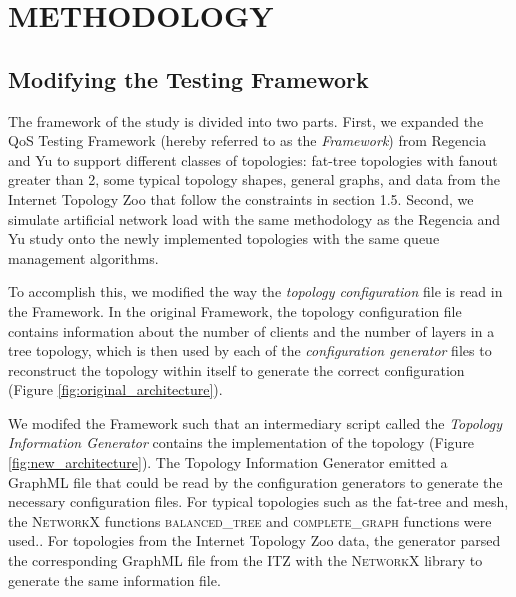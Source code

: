\chapter{METHODOLOGY}
\section{Modifying the Testing Framework}
The framework of the study is divided into two parts. First, we expanded the QoS Testing Framework (hereby referred to as the \textit{Framework}) from Regencia and Yu to support different classes of topologies: fat-tree topologies with fanout greater than 2, some typical topology shapes, general graphs, and data from the Internet Topology Zoo that follow the constraints in section 1.5. Second, we simulate artificial network load with the same methodology as the Regencia and Yu study onto the newly implemented topologies with the same queue management algorithms. 

To accomplish this, we modified the way the \textit{topology configuration} file is read in the Framework. In the original Framework, the topology configuration file contains information about the number of clients and the number of layers in a tree topology, which is then used by each of the \textit{configuration generator} files to reconstruct the topology within itself to generate the correct configuration (Figure \ref{fig:original_architecture}). 

We modifed the Framework such that an intermediary script called the \textit{Topology Information Generator} contains the implementation of the topology (Figure \ref{fig:new_architecture}). The Topology Information Generator emitted a GraphML file that could be read by the configuration generators to generate the necessary configuration files. For typical topologies such as the fat-tree and mesh, the \textsc{NetworkX} functions \textsc{balanced\_tree} and \textsc{complete\_graph} functions were used.. For topologies from the Internet Topology Zoo data, the generator parsed the corresponding GraphML file from the ITZ with the \textsc{NetworkX} library to generate the same information file.

